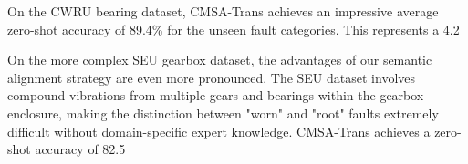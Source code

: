 \documentclass[journal]{IEEEtran}
\begin{document}
On the CWRU bearing dataset, CMSA-Trans achieves an impressive average zero-shot accuracy of 89.4\% for the unseen fault categories. This represents a 4.2%

On the more complex SEU gearbox dataset, the advantages of our semantic alignment strategy are even more pronounced. The SEU dataset involves compound vibrations from multiple gears and bearings within the gearbox enclosure, making the distinction between "worn" and "root" faults extremely difficult without domain-specific expert knowledge. CMSA-Trans achieves a zero-shot accuracy of 82.5%
\end{document}
